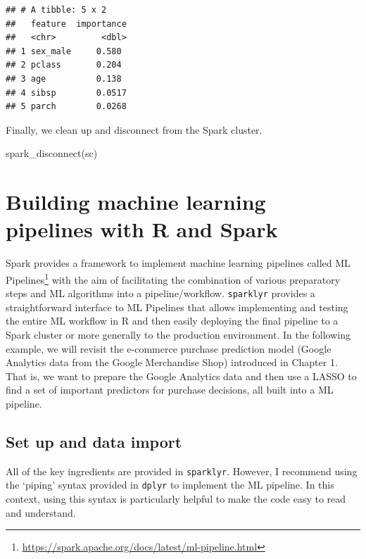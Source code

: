 \documentclass[
  12pt,
]{style/krantz}
\newenvironment{Shaded}{\begin{snugshade}}{\end{snugshade}}
\newcommand{\FunctionTok}[1]{\textcolor[rgb]{0.00,0.00,0.00}{#1}}
\newcommand{\NormalTok}[1]{#1}
\renewcommand{\href}[2]{#2\footnote{\url{#1}}}
\begin{document}
\begin{verbatim}
## # A tibble: 5 x 2
##   feature  importance
##   <chr>         <dbl>
## 1 sex_male     0.580 
## 2 pclass       0.204 
## 3 age          0.138 
## 4 sibsp        0.0517
## 5 parch        0.0268
\end{verbatim}

Finally, we clean up and disconnect from the Spark cluster.

\begin{Shaded}
\begin{Highlighting}[]
\FunctionTok{spark\_disconnect}\NormalTok{(sc)}
\end{Highlighting}
\end{Shaded}

\hypertarget{building-machine-learning-pipelines-with-r-and-spark}{%
\section{Building machine learning pipelines with R and Spark}\label{building-machine-learning-pipelines-with-r-and-spark}}

Spark provides a framework to implement machine learning pipelines called \href{https://spark.apache.org/docs/latest/ml-pipeline.html}{ML Pipelines} with the aim of facilitating the combination of various preparatory steps and ML algorithms into a pipeline/workflow. \texttt{sparklyr} provides a straightforward interface to ML Pipelines that allows implementing and testing the entire ML workflow in R and then easily deploying the final pipeline to a Spark cluster or more generally to the production environment. In the following example, we will revisit the e-commerce purchase prediction model (Google Analytics data from the Google Merchandise Shop) introduced in Chapter 1. That is, we want to prepare the Google Analytics data and then use a LASSO to find a set of important predictors for purchase decisions, all built into a ML pipeline.

\hypertarget{set-up-and-data-import}{%
\subsection{Set up and data import}\label{set-up-and-data-import}}

All of the key ingredients are provided in \texttt{sparklyr}. However, I recommend using the `piping' syntax provided in \texttt{dplyr} to implement the ML pipeline. In this context, using this syntax is particularly helpful to make the code easy to read and understand.
\end{document}
